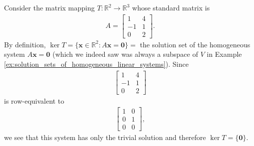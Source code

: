 \documentclass[12pt,letterpaper,reqno]{article}
\numberwithin{equation}{section}
\newcommand{\R}{\ensuremath{\mathbb R}}
\begin{document}
\begin{example}
Consider the matrix mapping $T:\R^2 \to \R^3$ whose standard matrix is 
\begin{align*}
	A=\begin{bmatrix}
		1 & 4 \\
		-1 & 1 \\
		 0 & 2		
	\end{bmatrix}.
\end{align*}	
By definition, $\ker T=\{\mathbf{x} \in \R^2:A\mathbf{x}=\mathbf{0}\}=$ the solution set of the homogeneous system $A\mathbf{x}=\mathbf{0}$ (which we indeed saw was always a subspace of $V$ in Example \ref{ex:solution_sets_of_homogeneous_linear_systems}). Since 
\begin{align*}
	\begin{bmatrix}
		1 & 4 \\ 
		-1 & 1 \\
		0 & 2
	\end{bmatrix}
\end{align*}
is row-equivalent to
\begin{align*}
	\begin{bmatrix}
		1 & 0 \\
		0 & 1 \\
		0 & 0
	\end{bmatrix},
\end{align*}
we see that this system has only the trivial solution and therefore $\ker T=\{\mathbf{0}\}$.


\end{example}
\end{document}
